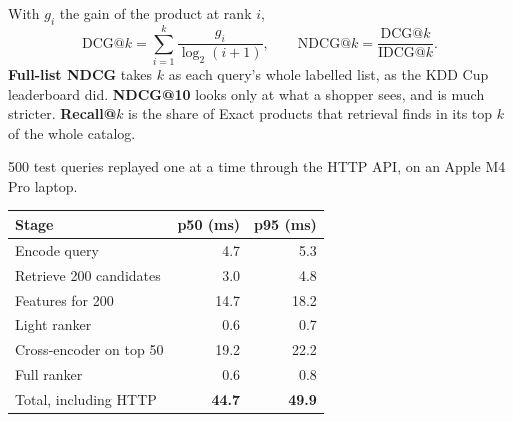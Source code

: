 \documentclass[12pt]{article}
\newlength{\colh}\setlength{\colh}{31cm}
\newcommand{\firsthead}[1]{{\Large\bfseries\color{accent}#1}\par\vspace{2pt}}
\newcommand{\head}[1]{\vspace{10pt plus 1fil}\firsthead{#1}}
\begin{document}
\begin{minipage}[t][\colh][s]{0.31\textwidth}
\head{Metrics}
With $g_i$ the gain of the product at rank $i$,
\[
\mathrm{DCG@}k=\sum_{i=1}^{k}\frac{g_i}{\log_2(i+1)},\qquad
\mathrm{NDCG@}k=\frac{\mathrm{DCG@}k}{\mathrm{IDCG@}k}.
\]
\textbf{Full-list NDCG} takes $k$ as each query's whole labelled list, as the KDD Cup leaderboard did.
\textbf{NDCG@10} looks only at what a shopper sees, and is much stricter.
\textbf{Recall@}$k$ is the share of Exact products that retrieval finds in its top $k$ of the whole catalog.

\head{Latency}
500 test queries replayed one at a time through the HTTP API, on an Apple M4 Pro laptop.

\begin{center}
\begin{tabular}{lrr}
\toprule
Stage & p50 (ms) & p95 (ms) \\
\midrule
Encode query & 4.7 & 5.3 \\
Retrieve 200 candidates & 3.0 & 4.8 \\
Features for 200 & 14.7 & 18.2 \\
Light ranker & 0.6 & 0.7 \\
Cross-encoder on top 50 & 19.2 & 22.2 \\
Full ranker & 0.6 & 0.8 \\
\midrule
Total, including HTTP & \textbf{44.7} & \textbf{49.9} \\
\bottomrule
\end{tabular}
\end{center}
\end{minipage}\hfill
\end{document}
